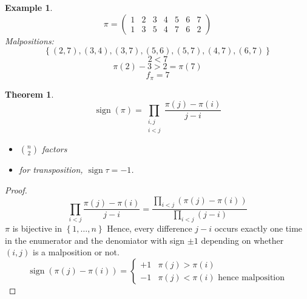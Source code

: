 \documentclass{article}
\newtheorem{theorem}{Theorem}  \numberwithin{theorem}{section}
\newtheorem{example}{Example}  \numberwithin{example}{section}
\newcommand{\set}[1]{\left\{#1\right\}}
\DeclareMathOperator{\sign}{sign}
\begin{document}
\begin{example} %
  \[ \pi = \begin{pmatrix} 1 & 2 & 3 & 4 & 5 & 6 & 7 \\ 1 & 3 & 5 & 4 & 7 & 6 & 2 \end{pmatrix} \]
  Malpositions:
  \[ \set{(2,7), (3,4), (3,7), (5,6), (5,7), (4,7), (6,7)} \]
  \[ 2 < 7 \]
  \[ \pi(2) - 3 > 2 = \pi(7) \]
  \[ f_\pi = 7 \]
\end{example}

\begin{theorem}
  \[ \sign(\pi) = \prod_{\substack{i,j \\ i < j}} \frac{\pi(j) - \pi(i)}{j-i} \]
  \begin{itemize}
    \item ${n \choose 2}$ factors
    \item for transposition, $\sign\tau = -1$.
  \end{itemize}
\end{theorem}

\begin{proof}
  \[ \prod_{i<j} \frac{\pi(j) - \pi(i)}{j-i} = \frac{\prod_{i<j} (\pi(j) - \pi(i))}{\prod_{i<j} (j-i)} \]
  $\pi$ is bijective in $\set{1, \dots, n}$
  Hence, every difference $j - i$ occurs exactly one time in the enumerator and the denomiator with sign $\pm 1$
  depending on whether $(i,j)$ is a malposition or not.
  \[ \sign(\pi(j) - \pi(i)) = \begin{cases}
    +1 & \pi(j) > \pi(i) \\
    -1 & \pi(j) < \pi(i) \text{ hence malposition}
  \end{cases} \]
\end{proof}
\end{document}

